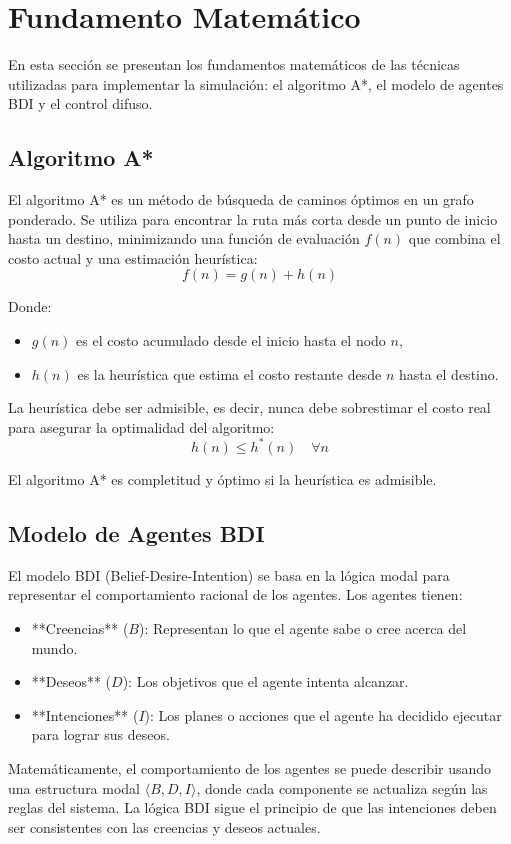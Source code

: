\documentclass[10pt,twocolumn]{article}
\begin{document}
	\section{Fundamento Matemático}
	En esta sección se presentan los fundamentos matemáticos de las técnicas utilizadas para implementar la simulación: el algoritmo A*, el modelo de agentes BDI y el control difuso.
	
	\subsection{Algoritmo A*}
	El algoritmo A* es un método de búsqueda de caminos óptimos en un grafo ponderado. Se utiliza para encontrar la ruta más corta desde un punto de inicio hasta un destino, minimizando una función de evaluación \(f(n)\) que combina el costo actual y una estimación heurística:
	\[
	f(n) = g(n) + h(n)
	\]
	
	Donde:
	\begin{itemize}
		\item \(g(n)\) es el costo acumulado desde el inicio hasta el nodo \(n\),
		\item \(h(n)\) es la heurística que estima el costo restante desde \(n\) hasta el destino.
	\end{itemize}
	
	La heurística debe ser admisible, es decir, nunca debe sobrestimar el costo real para asegurar la optimalidad del algoritmo:
	\[
	h(n) \leq h^*(n) \quad \forall n
	\]
	
	El algoritmo A* es completitud y óptimo si la heurística es admisible.
	
	\subsection{Modelo de Agentes BDI}
	El modelo BDI (Belief-Desire-Intention) se basa en la lógica modal para representar el comportamiento racional de los agentes. Los agentes tienen:
	\begin{itemize}
		\item **Creencias** (\(B\)): Representan lo que el agente sabe o cree acerca del mundo.
		\item **Deseos** (\(D\)): Los objetivos que el agente intenta alcanzar.
		\item **Intenciones** (\(I\)): Los planes o acciones que el agente ha decidido ejecutar para lograr sus deseos.
	\end{itemize}
	
	Matemáticamente, el comportamiento de los agentes se puede describir usando una estructura modal \( \langle B, D, I \rangle \), donde cada componente se actualiza según las reglas del sistema. La lógica BDI sigue el principio de que las intenciones deben ser consistentes con las creencias y deseos actuales.
	
\end{document}
